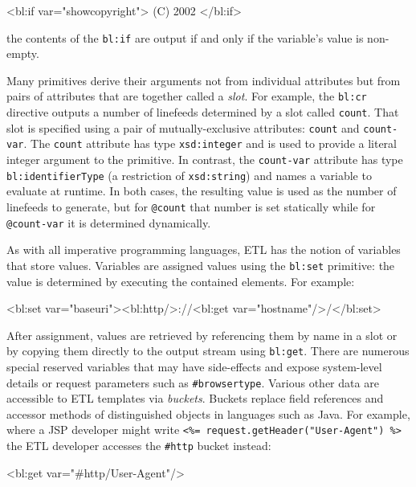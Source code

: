 \documentclass{www2003-submission}
\newcommand{\smtexttt}[1]{{\small\texttt{#1}}}
\newcommand{\etl}{ETL}
\newenvironment{smallverbatim}%
{\renewcommand{\baselinestretch}{1}\small\verbatim}%
{\renewcommand{\baselinestretch}{2}\endverbatim}
\begin{document}
\begin{smallverbatim}
<bl:if var="showcopyright"> (C) 2002 </bl:if>
\end{smallverbatim}

\noindent the contents of the \smtexttt{bl:if} are output if and
only if the variable's value is non-empty.

Many primitives derive their arguments not from individual attributes
but from pairs of attributes that are together called a \emph{slot}.
For example, the \smtexttt{bl:cr} directive outputs a number of
linefeeds determined by a slot called \smtexttt{count}.  That slot is
specified using a pair of mutually-exclusive attributes: \smtexttt{count} and
\smtexttt{count-var}.  The \smtexttt{count} attribute has type
\smtexttt{xsd:integer} and is used to provide a literal integer
argument to the primitive.  In contrast, the \smtexttt{count-var}
attribute has type \smtexttt{bl:identifierType} (a restriction of
\smtexttt{xsd:string}) and names a variable to evaluate at runtime.
In both cases, the resulting value is used as the number of linefeeds
to generate, but for \smtexttt{@count} that number is set statically
while for \smtexttt{@count-var} it is determined dynamically.

As with all imperative programming languages, \etl{} has the notion of
variables that store values. Variables are assigned values using the
\smtexttt{bl:set} primitive: the value is determined by executing the
contained elements. For example:

\begin{smallverbatim}
<bl:set var="baseuri"><bl:http/>://<bl:get
 var="hostname"/>/</bl:set>
\end{smallverbatim}

After assignment, values are retrieved by referencing them by name in
a slot or by copying them directly to the output stream using
\smtexttt{bl:get}.  There are numerous special reserved variables that may have
side-effects and expose system-level details or request parameters such as \smtexttt{\#browsertype}.
Various other data are accessible to \etl{} templates via
\emph{buckets}. Buckets replace field references and accessor methods of
distinguished objects in languages such as Java.  For example, where a
JSP developer might write \smtexttt{<\%= request.getHeader("User-Agent") \%>}
the \etl{} developer accesses the \smtexttt{\#http}
bucket instead:

\begin{smallverbatim}
<bl:get var="#http/User-Agent"/>
\end{smallverbatim}
\end{document}
